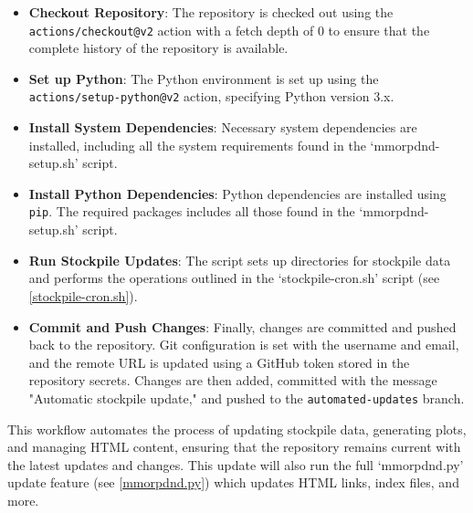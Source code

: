 \begin{itemize}
    \item \textbf{Checkout Repository}: The repository is checked out using the \texttt{actions/checkout@v2} action with a fetch depth of 0 to ensure that the complete history of the repository is available.
    
    \item \textbf{Set up Python}: The Python environment is set up using the \texttt{actions/setup-python@v2} action, specifying Python version 3.x.
    
    \item \textbf{Install System Dependencies}: Necessary system dependencies are installed, including all the system requirements found in the `mmorpdnd-setup.sh' script.
    
    \item \textbf{Install Python Dependencies}: Python dependencies are installed using \texttt{pip}. The required packages includes all those found in the `mmorpdnd-setup.sh' script.
    \item \textbf{Run Stockpile Updates}: The script sets up directories for stockpile data and performs the operations outlined in the `stockpile-cron.sh' script (see \ref{stockpile-cron.sh}).
    
    \item \textbf{Commit and Push Changes}: Finally, changes are committed and pushed back to the repository. Git configuration is set with the username and email, and the remote URL is updated using a GitHub token stored in the repository secrets. Changes are then added, committed with the message "Automatic stockpile update," and pushed to the \texttt{automated-updates} branch.
\end{itemize}

This workflow automates the process of updating stockpile data, generating plots, and managing HTML content, ensuring that the repository remains current with the latest updates and changes. This update will also run the full `mmorpdnd.py' update feature (see \ref{mmorpdnd.py}) which updates HTML links, index files, and more.



